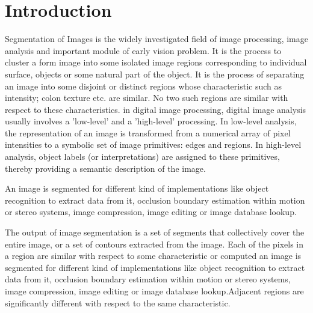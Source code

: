 \chapter{Introduction}
\label{intro}
Segmentation of Images \cite{Segmentation} is the widely investigated field of image processing, image analysis and important module of early vision problem. It is the process to cluster a form image into some isolated image regions corresponding to individual surface, objects or some natural part of the object. It is the process of separating an image into some disjoint or distinct regions whose characteristic such as intensity; colon texture etc. are similar. No two such regions are similar with respect to these characteristics. in digital image processing, digital image analysis usually involves a 'low-level' and a 'high-level' processing. In low-level analysis, the representation of an image is transformed from a numerical array of pixel intensities to a symbolic set of image primitives: edges and regions. In high-level analysis, object labels (or interpretations) are assigned to these primitives, thereby providing a semantic description of the image.

An image is segmented \cite{Segmentation} for different kind of implementations like object recognition to extract data from it, occlusion boundary estimation within motion or stereo systems, image compression, image editing or image database lookup.

The output of image segmentation is a set of segments that collectively cover the entire image, or a set of contours extracted from the image. Each of the pixels in a region are similar with respect to some characteristic or computed an image is segmented for different kind of implementations like object recognition to extract data from it, occlusion boundary estimation within motion or stereo systems, image compression, image editing or image database lookup.Adjacent regions are significantly different with respect to the same characteristic.
 
